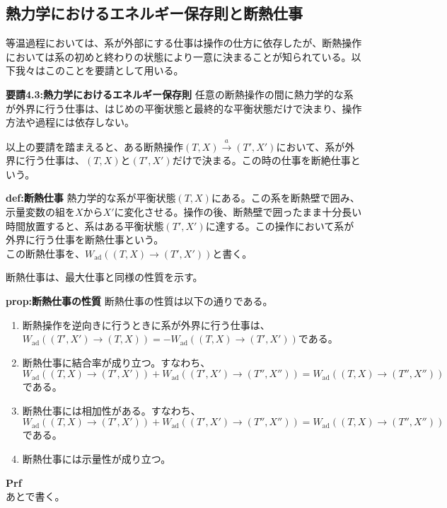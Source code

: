 \documentclass[a4paper,11pt]{jsarticle}
\begin{document}
\subsection{熱力学におけるエネルギー保存則と断熱仕事}
等温過程においては、系が外部にする仕事は操作の仕方に依存したが、断熱操作においては系の初めと終わりの状態により一意に決まることが知られている。以下我々はこのことを要請として用いる。\\
\begin{itembox}[l]{\textbf{要請4.3:熱力学におけるエネルギー保存則}}
    任意の断熱操作の間に熱力学的な系が外界に行う仕事は、はじめの平衡状態と最終的な平衡状態だけで決まり、操作方法や過程には依存しない。
\end{itembox}
以上の要請を踏まえると、ある断熱操作$(T,X) \xrightarrow{a} (T',X')$において、系が外界に行う仕事は、$(T,X)$と$(T',X')$だけで決まる。この時の仕事を断絶仕事という。\\
\begin{itembox}[l]{\textbf{def:断熱仕事}}
    熱力学的な系が平衡状態$(T,X)$にある。この系を断熱壁で囲み、示量変数の組を$X$から$X'$に変化させる。操作の後、断熱壁で囲ったまま十分長い時間放置すると、系はある平衡状態$(T',X')$に達する。この操作において系が外界に行う仕事を断熱仕事という。\\
    この断熱仕事を、$W_{\text{ad}}((T,X)\rightarrow (T',X'))$と書く。
\end{itembox}
断熱仕事は、最大仕事と同様の性質を示す。\\
\begin{itembox}[l]{\textbf{prop:断熱仕事の性質}}
    断熱仕事の性質は以下の通りである。
    \begin{enumerate}
        \item 断熱操作を逆向きに行うときに系が外界に行う仕事は、$W_{\text{ad}}((T',X')\rightarrow (T,X)) = -W_{\text{ad}}((T,X)\rightarrow (T',X'))$である。
        \item 断熱仕事に結合率が成り立つ。すなわち、$W_{\text{ad}}((T,X)\rightarrow (T',X'))+W_{\text{ad}}((T',X')\rightarrow (T'',X'')) = W_{\text{ad}}((T,X)\rightarrow (T'',X''))$である。
        \item 断熱仕事には相加性がある。すなわち、$W_{\text{ad}}((T,X)\rightarrow (T',X'))+W_{\text{ad}}((T',X')\rightarrow (T'',X'')) = W_{\text{ad}}((T,X)\rightarrow (T'',X''))$である。
        \item 断熱仕事には示量性が成り立つ。
    \end{enumerate} 
\end{itembox}
\textbf{Prf}\\
あとで書く。\\
\end{document}
